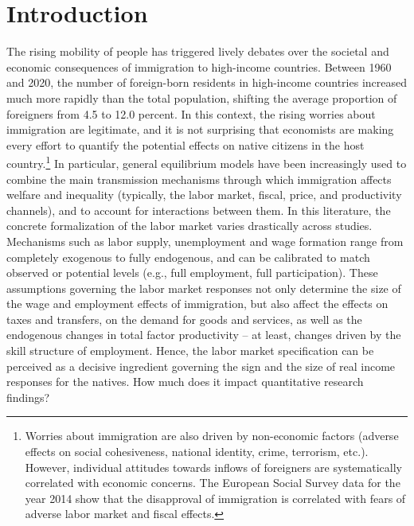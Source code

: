\documentclass[a4paper,12pt]{article}
\begin{document}
\clearpage
\section{Introduction}

The rising mobility of people has triggered lively debates over the societal and economic consequences of immigration to high-income countries. Between 1960 and 2020, the number of foreign-born residents in high-income countries increased much more rapidly than the total population, shifting the average proportion of foreigners from 4.5 to 12.0 percent. In this context, the rising worries about immigration are legitimate, and it is not surprising that economists are making every effort to quantify the potential effects on native citizens in the host country.\footnote{Worries about immigration are also driven by non-economic factors (adverse effects on social cohesiveness, national identity, crime, terrorism, etc.). However, individual attitudes towards inflows of foreigners are systematically correlated with economic concerns. The European Social Survey data for the year 2014 show that the disapproval of immigration is correlated with fears of adverse labor market and fiscal effects.} In particular, general equilibrium models have been increasingly used to combine the main transmission mechanisms through which immigration affects welfare and inequality (typically, the labor market, fiscal, price, and productivity channels), and to account for interactions between them. In this literature, the concrete formalization of the labor market varies drastically across studies. Mechanisms such as labor supply, unemployment and wage formation range from completely exogenous to fully endogenous, and can be calibrated to match observed or potential levels (e.g., full employment, full participation). These assumptions governing the labor market responses not only determine the size of the wage and employment effects of immigration, but also affect the effects on taxes and transfers, on the demand for goods and services, as well as the endogenous changes in total factor productivity -- at least, changes driven by the skill structure of employment. Hence, the labor market specification can be perceived as a decisive ingredient governing the sign and the size of real income responses for the natives. How much does it impact quantitative research findings?
\end{document}
